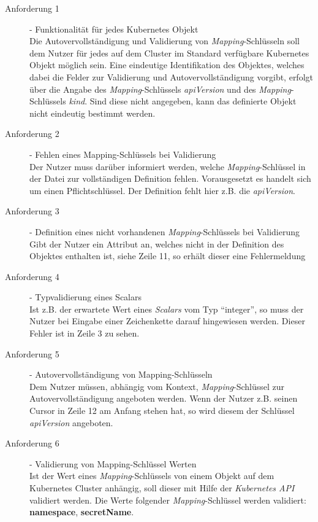 \begin{description}
  \item[Anforderung 1]{- Funktionalität für jedes Kubernetes Objekt\\}
        Die Autovervollständigung und Validierung von \textit{Mapping}-Schlüsseln soll dem Nutzer für jedes auf dem Cluster im Standard verfügbare Kubernetes Objekt möglich sein.
        Eine eindeutige Identifikation des Objektes, welches dabei die Felder zur Validierung und Autovervollständigung vorgibt, erfolgt über
        die Angabe des \textit{Mapping}-Schlüssels \textit{apiVersion} und des \textit{Mapping}-Schlüssels \textit{kind}. Sind diese nicht angegeben, kann das definierte Objekt nicht
        eindeutig bestimmt werden.
  \item[Anforderung 2]{- Fehlen eines Mapping-Schlüssels bei Validierung\\}
        Der Nutzer muss darüber informiert werden, welche \textit{Mapping}-Schlüssel in der Datei zur vollständigen Definition fehlen.
        Vorausgesetzt es handelt sich um einen Pflichtschlüssel.
        Der Definition fehlt hier z.B. die \textit{apiVersion}.
  \item[Anforderung 3]{- Definition eines nicht vorhandenen \textit{Mapping}-Schlüssels bei Validierung\\}
        Gibt der Nutzer ein Attribut an, welches nicht in der Definition des Objektes enthalten ist, siehe Zeile 11, so erhält dieser eine Fehlermeldung
  \item[Anforderung 4]{- Typvalidierung eines Scalars\\}
        Ist z.B. der erwartete Wert eines \textit{Scalars} vom Typ ``integer'',
        so muss der Nutzer bei Eingabe einer Zeichenkette darauf hingewiesen werden. Dieser Fehler ist in Zeile 3 zu sehen.
  \item[Anforderung 5]{- Autovervollständigung von Mapping-Schlüsseln\\}
        Dem Nutzer müssen, abhängig vom Kontext, \textit{Mapping}-Schlüssel zur Autovervollständigung angeboten werden.
        Wenn der Nutzer z.B. seinen Cursor in Zeile 12 am Anfang stehen hat, so wird diesem der Schlüssel \textit{apiVersion} angeboten.
  \item[Anforderung 6]{- Validierung von Mapping-Schlüssel Werten\\}
        Ist der Wert eines \textit{Mapping}-Schlüssels von einem Objekt auf dem Kubernetes Cluster anhängig, soll dieser mit Hilfe
        der \textit{Kubernetes API} validiert werden.
        Die Werte folgender \textit{Mapping}-Schlüssel werden validiert: \textbf{namespace}, \textbf{secretName}.

\end{description}
